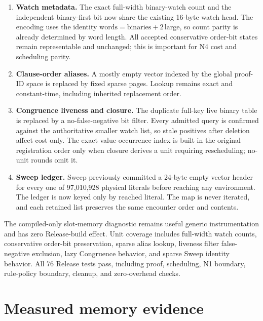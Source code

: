 \documentclass[11pt]{article}
\begin{document}
\begin{enumerate}
  \item \textbf{Watch metadata.}  The exact full-width binary-watch count and
  the independent binary-first bit now share the existing 16-byte watch head.
  The encoding uses the identity
  \(\mathrm{words}=\mathrm{binaries}+2\,\mathrm{large}\), so count parity is
  already determined by word length.  All accepted conservative order-bit
  states remain representable and unchanged; this is important for N4 cost and
  scheduling parity.

  \item \textbf{Clause-order aliases.}  A mostly empty vector indexed by the
  global proof-ID space is replaced by fixed sparse pages.  Lookup remains
  exact and constant-time, including inherited replacement order.

  \item \textbf{Congruence liveness and closure.}  The duplicate full-key live
  binary table is replaced by a no-false-negative bit filter.  Every admitted
  query is confirmed against the authoritative smaller watch list, so stale
  positives after deletion affect cost only.  The exact value-occurrence index
  is built in the original registration order only when closure derives a unit
  requiring rescheduling; no-unit rounds omit it.

  \item \textbf{Sweep ledger.}  Sweep previously committed a 24-byte empty
  vector header for every one of 97,010,928 physical literals before reaching
  any environment.  The ledger is now keyed only by reached literal.  The map
  is never iterated, and each retained list preserves the same encounter order
  and contents.
\end{enumerate}

The compiled-only slot-memory diagnostic remains useful generic instrumentation
and has zero Release-build effect.  Unit coverage includes full-width watch
counts, conservative order-bit preservation, sparse alias lookup, liveness
filter false-negative exclusion, lazy Congruence behavior, and sparse Sweep
identity behavior.  All 76 Release tests pass, including proof, scheduling,
N1 boundary, rule-policy boundary, cleanup, and zero-overhead checks.

\section{Measured memory evidence}
\end{document}
